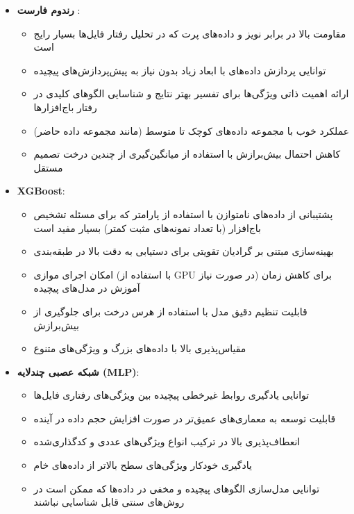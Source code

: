 \begin{itemize}
    \item \textbf{رندوم فارست }:
    \begin{itemize}
        \item مقاومت بالا در برابر نویز و داده‌های پرت که در تحلیل رفتار فایل‌ها بسیار رایج است
        \item توانایی پردازش داده‌های با ابعاد زیاد بدون نیاز به پیش‌پردازش‌های پیچیده
        \item ارائه اهمیت ذاتی ویژگی‌ها برای تفسیر بهتر نتایج و شناسایی الگوهای کلیدی در رفتار باج‌افزارها
        \item عملکرد خوب با مجموعه داده‌های کوچک تا متوسط (مانند مجموعه داده حاضر)
        \item کاهش احتمال بیش‌برازش با استفاده از میانگین‌گیری از چندین درخت تصمیم مستقل
    \end{itemize}

    \item \textbf{XGBoost}:
    \begin{itemize}
        \item پشتیبانی از داده‌های نامتوازن با استفاده از پارامتر  که برای مسئله تشخیص باج‌افزار (با تعداد نمونه‌های مثبت کمتر) بسیار مفید است
        \item بهینه‌سازی مبتنی بر گرادیان تقویتی برای دستیابی به دقت بالا در طبقه‌بندی
        \item امکان اجرای موازی (با استفاده از GPU در صورت نیاز) برای کاهش زمان آموزش در مدل‌های پیچیده
        \item قابلیت تنظیم دقیق مدل با استفاده از هرس درخت برای جلوگیری از بیش‌برازش
        \item مقیاس‌پذیری بالا با داده‌های بزرگ و ویژگی‌های متنوع
    \end{itemize}

    \item \textbf{شبکه عصبی چندلایه (MLP)}:
    \begin{itemize}
        \item توانایی یادگیری روابط غیرخطی پیچیده بین ویژگی‌های رفتاری فایل‌ها
        \item قابلیت توسعه به معماری‌های عمیق‌تر در صورت افزایش حجم داده در آینده
        \item انعطاف‌پذیری بالا در ترکیب انواع ویژگی‌های عددی و کدگذاری‌شده
        \item یادگیری خودکار ویژگی‌های سطح بالاتر  از داده‌های خام
        \item توانایی مدل‌سازی الگوهای پیچیده و مخفی در داده‌ها که ممکن است در روش‌های سنتی قابل شناسایی نباشند
    \end{itemize}
\end{itemize}

